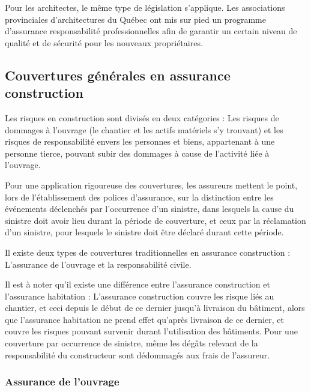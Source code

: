 \documentclass[11pt]{article}
\begin{document}
Pour les architectes, le même type de législation s'applique. Les associations provinciales d'architectures du Québec ont mis sur pied un programme d'assurance responsabilité professionnelles afin de garantir un certain niveau de qualité et de sécurité pour les nouveaux propriétaires. 

\subsection{Couvertures générales en assurance construction}

Les risques en construction sont divisés en deux catégories : Les risques de dommages à l'ouvrage (le chantier et les actifs matériels s'y trouvant) et les risques de responsabilité envers les personnes et biens, appartenant à une personne tierce, pouvant subir des dommages à cause de l'activité liée à l'ouvrage.

Pour une application rigoureuse des couvertures, les assureurs mettent le point, lors de l'établissement des polices d'assurance, sur la distinction entre les événements déclenchés par l'occurrence d'un sinistre, dans lesquels la cause du sinistre doit avoir lieu durant la période de couverture, et ceux par la réclamation d'un sinistre, pour lesquels le sinistre doit être déclaré durant cette période.

Il existe deux types de couvertures traditionnelles en assurance construction : L'assurance de l'ouvrage et la responsabilité civile. 

Il est à noter qu'il existe une différence entre l'assurance construction et l'assurance habitation : L'assurance construction couvre les risque liés au chantier, et ceci depuis le début de ce dernier jusqu'à livraison du bâtiment, alors que l'assurance habitation ne prend effet qu'après livraison de ce dernier, et couvre les risques pouvant survenir durant l'utilisation des bâtiments. Pour une couverture par occurrence de sinistre, même les dégâts relevant de la responsabilité du constructeur sont dédommagés aux frais de l'assureur.

\subsubsection{Assurance de l'ouvrage}
\end{document}
